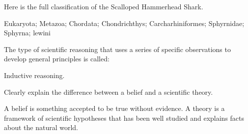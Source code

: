 \documentclass[11pt, addpoints]{exam}
\begin{document}

\begin{questions}

\question[4]
Here is the full classification of the Scalloped Hammerhead Shark. 

Eukaryota; Metazoa; Chordata; Chondrichthys; Carcharhiniformes; Sphyrnidae; Sphyrna; lewini \vspace{\baselineskip}



\question[2]
The type of scientific reasoning that uses a series of specific observations to develop general principles is called:
	\begin{solution}
	Inductive reasoning.
	\end{solution}	


\question[4]
Clearly explain the difference between a belief and a scientific theory.

	\begin{solution}
	A belief is something accepted to be true without evidence. A theory is a framework of scientific hypotheses that has been well studied and explains facts about the natural world.
	\end{solution}


\end{questions}
\end{document}
